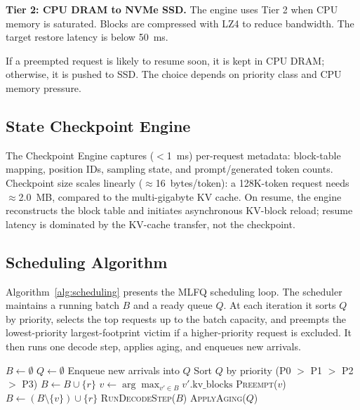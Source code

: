 \documentclass[conference]{IEEEtran}
\begin{document}
\textbf{Tier 2: CPU DRAM to NVMe SSD.} The engine uses Tier 2 when CPU memory is saturated. Blocks are compressed with LZ4 to reduce bandwidth. The target restore latency is below 50~ms.

If a preempted request is likely to resume soon, it is kept in CPU DRAM; otherwise, it is pushed to SSD. The choice depends on priority class and CPU memory pressure.

\subsection{State Checkpoint Engine}

The Checkpoint Engine captures ($<$1~ms) per-request metadata: block-table mapping, position IDs, sampling state, and prompt/generated token counts. Checkpoint size scales linearly ($\approx$16~bytes/token): a 128K-token request needs $\approx$2.0~MB, compared to the multi-gigabyte KV cache. On resume, the engine reconstructs the block table and initiates asynchronous KV-block reload; resume latency is dominated by the KV-cache transfer, not the checkpoint.

\subsection{Scheduling Algorithm}

Algorithm~\ref{alg:scheduling} presents the MLFQ scheduling loop. The scheduler maintains a running batch $B$ and a ready queue $Q$. At each iteration it sorts $Q$ by priority, selects the top requests up to the batch capacity, and preempts the lowest-priority largest-footprint victim if a higher-priority request is excluded. It then runs one decode step, applies aging, and enqueues new arrivals.

\begin{algorithm}[t]
\caption{InterruptLLM MLFQ Scheduling Loop}
\label{alg:scheduling}
\small
\begin{algorithmic}[1]
\State $B \gets \emptyset$ 
\State $Q \gets \emptyset$ 
\Loop
    \State Enqueue new arrivals into $Q$
    \State Sort $Q$ by priority (P0 $>$ P1 $>$ P2 $>$ P3)
            \State $B \gets B \cup \{r\}$
            \State $v \gets \arg\max_{v' \in B} v'.\text{kv\_blocks}$ 
            \State \textsc{Preempt}($v$) 
            \State $B \gets (B \setminus \{v\}) \cup \{r\}$
        \EndIf
    \EndFor
    \State \textsc{RunDecodeStep}($B$) 
    \State \textsc{ApplyAging}($Q$) 
\EndLoop
\end{algorithmic}
\end{algorithm}
\end{document}
